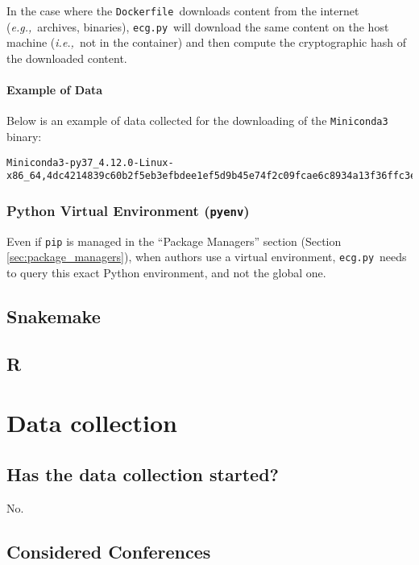 \documentclass{article}
\newcommand{\dfile}{\texttt{Dockerfile}}
\newcommand{\ecg}{\texttt{ecg.py}}
\newcommand{\eg}{\emph{e.g.,}}
\newcommand{\ie}{\emph{i.e.,}}
\begin{document}
In the case where the \dfile\ downloads content from the internet (\eg\ archives, binaries), \ecg\ will download the same content on the host machine (\ie\ not in the container) and then compute the cryptographic hash of the downloaded content.

\paragraph{Example of Data}

Below is an example of data collected for the downloading of the \texttt{Miniconda3} binary:

\begin{lstlisting}
Miniconda3-py37_4.12.0-Linux-x86_64,4dc4214839c60b2f5eb3efbdee1ef5d9b45e74f2c09fcae6c8934a13f36ffc3e,misc
\end{lstlisting}

\subsubsection{Python Virtual Environment (\texttt{pyenv})}\label{sec:pyenv}

Even if \texttt{pip} is managed in the ``Package Managers'' section (Section \ref{sec:package_managers}), when authors use a virtual environment, \ecg\ needs to query this exact Python environment, and not the global one.

\subsection{Snakemake}

\subsection{R}

\section{Data collection}

\subsection{Has the data collection started?}

No.

\subsection{Considered Conferences}
\end{document}
